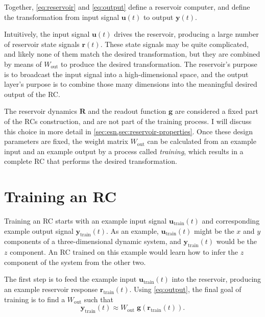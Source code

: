 
Together, \cref{eq:reservoir} and \cref{eq:output} define a reservoir
computer, and define the transformation from input signal $\bm{u}(t)$
to output $\bm{y}(t)$.

Intuitively, the input signal $\bm{u}(t)$ drives the reservoir,
producing a large number of reservoir state signals $\bm{r}(t)$. These
state signals may be quite complicated, and likely none of them match
the desired transformation, but they are combined by means of
$W_\text{out}$ to produce the desired transformation. The reservoir's
purpose is to broadcast the input signal into a high-dimensional
space, and the output layer's purpose is to combine those many dimensions
into the meaningful desired output of the RC.

The reservoir dynamics $\bm{R}$ and the readout function $\bm{g}$ are
considered a fixed part of the RCs construction, and are not part of
the training process. I will discuss this choice in more detail in
\cref{sec:esn,sec:reservoir-properties}. Once these design parameters
are fixed, the weight matrix $W_\text{out}$ can be calculated from an
example input and an example output by a process called
\emph{training}, which results in a complete RC that performs the desired
transformation.

\section{Training an RC}\label{sec:training}

Training an RC starts with an example input signal
$\bm{u}_\text{train}(t)$ and corresponding example output signal
$\bm{y}_\text{train}(t)$. As an example, $\bm{u}_\text{train}(t)$ might be
the $x$ and $y$ components of a three-dimensional dynamic system, and
$\bm{y}_\text{train}(t)$ would be the $z$ component. An RC trained on this
example would learn how to infer the $z$ component of the system from
the other two.

The first step is to feed the example input $\bm{u}_\text{train}(t)$ into the reservoir, producing an example reservoir response $\bm{r}_\text{train}(t)$. Using \cref{eq:output}, the final goal of training is to find a $W_\text{out}$ such that
\begin{equation}
  \label{eq:approx-output}
  \mathbf{y}_\text{train}(t) \approx W_\text{out}\;\mathbf{g}\left(\mathbf{r}_\text{train}(t)\right).
\end{equation}

